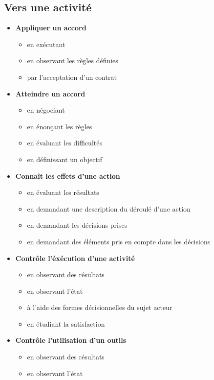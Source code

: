 \documentclass[8pt,a4paper]{article}
\begin{document}
\subsection{Vers une activité}
\begin{itemize}
\item \textbf{Appliquer un accord}
\begin{itemize}
\item en exécutant
\item en observant les règles définies
\item par l'acceptation d'un contrat
\\ 
 \end{itemize}
\item \textbf{Atteindre un accord}
\begin{itemize}
\item en négociant
\item en énonçant les règles
\item en évaluant les difficultés
\item en définissant un objectif
\\ 
 \end{itemize}
\item \textbf{Connaît les effets d'une action}
\begin{itemize}
\item en évaluant les résultats
\item en demandant une description du déroulé d'une action
\item en demandant les décisions prises
\item en demandant des éléments pris en compte dans les décisions
\\ 
 \end{itemize}
\item \textbf{Contrôle l'éxécution d'une activité}
\begin{itemize}
\item en observant des résultats
\item en observant l'état
\item à l'aide des formes décisionnelles du sujet acteur
\item en étudiant la satisfaction
\\ 
 \end{itemize}
\item \textbf{Contrôle l'utilisation d'un outils}
\begin{itemize}
\item en observant des résultats
\item en observant l'état

\end{itemize}
\end{itemize}
\end{document}
